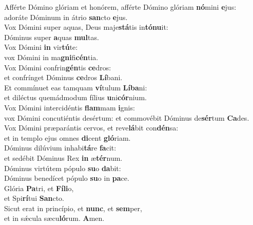 \evenverse Afférte Dómino glóriam et honórem, afférte Dómino glóriam \textbf{nó}mini \textbf{e}jus:~\*\\
\evenverse adoráte Dóminum in átrio \textbf{san}cto \textbf{e}jus.\\
\oddverse Vox Dómini super aquas, Deus maje\textbf{stá}tis in\textbf{tó}\textbf{nu}it:~\*\\
\oddverse Dóminus super \textbf{a}quas \textbf{mul}tas.\\
\evenverse Vox Dómini \textbf{in} vir\textbf{tú}te:~\*\\
\evenverse vox Dómini in ma\textbf{gni}fi\textbf{cén}tia.\\
\oddverse Vox Dómini confrin\textbf{gén}tis \textbf{ce}dros:~\*\\
\oddverse et confrínget Dóminus \textbf{ce}dros \textbf{Lí}bani.\\
\evenverse Et commínuet eas tamquam \textbf{ví}tulum \textbf{Lí}\textbf{ba}ni:~\*\\
\evenverse et diléctus quemádmodum fílius \textbf{u}ni\textbf{cór}nium.\\
\oddverse Vox Dómini intercidéntis \textbf{flam}mam \textbf{i}gnis:~\*\\
\oddverse vox Dómini concutiéntis desértum: et commovébit Dóminus de\textbf{sér}tum \textbf{Ca}des.\\
\evenverse Vox Dómini præparántis cervos, et reve\textbf{lá}bit con\textbf{dén}sa:~\*\\
\evenverse et in templo ejus omnes \textbf{di}cent \textbf{gló}riam.\\
\oddverse Dóminus dilúvium inhabi\textbf{tá}re \textbf{fa}cit:~\*\\
\oddverse et sedébit Dóminus Rex \textbf{in} æ\textbf{tér}num.\\
\evenverse Dóminus virtútem pópulo \textbf{su}o \textbf{da}bit:~\*\\
\evenverse Dóminus benedícet pópulo \textbf{su}o in \textbf{pa}ce.\\
\oddverse Glória \textbf{Pa}tri, et \textbf{Fí}\textbf{li}o,~\*\\
\oddverse et Spi\textbf{rí}tui \textbf{San}cto.\\
\evenverse Sicut erat in princípio, et \textbf{nunc}, et \textbf{sem}per,~\*\\
\evenverse et in sǽcula sæcu\textbf{ló}rum. \textbf{A}men.\\
